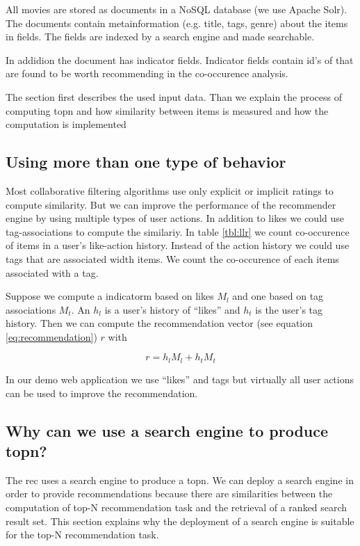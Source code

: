 All movies are stored as documents in a NoSQL database (we use Apache Solr). The documents contain metainformation (e.g. title, tags, genre) about the items in fields. The fields are indexed by a search engine and made searchable.

In addidion the document has indicator fields. Indicator fields contain id's of that are found to be worth recommending in the co-occurence analysis.

The section first describes the used input data. Than we explain the process of computing \gls{topn} and how similarity between items is measured and how the computation is implemented





\subsection{Using more than one type of behavior}
\label{sec:multimodal}

Most collaborative filtering algorithms use only explicit or implicit ratings to compute similarity.
But we can improve the performance of the recommender engine by using multiple types of user actions. In addition to likes we could use tag-associations to compute the similariy. In table \ref{tbl:llr} we count co-occurence of items in a user's like-action history. Instead of the action history we could use tags that are associated width items. We count the co-occurence of each items associated with a tag.

Suppose we compute a \gls{indicatorm} based on likes $M_l$ and one based on tag associations $M_t$. An $h_l$ is a user's history of ``likes'' and $h_t$ is the user's tag history. Then we can compute the recommendation vector (see equation \ref{eq:recommendation}) $r$ with

\begin{equation}
  \label{eq:multi}
  r = h_l M_l + h_t M_t
\end{equation}

In our demo web application we use ``likes'' and tags but virtually all user actions can be used to improve the recommendation.

\subsection{Why can we use a search engine to produce \gls{topn}?}
\label{sec:relation}

The \gls{rec} uses a search engine to produce a \gls{topn}. We can deploy a search engine in order to provide recommendations because there are similarities between the computation of top-N recommendation task and the retrieval of a ranked search result set.
 This section explains why the deployment of a search engine is suitable for the top-N recommendation task.

